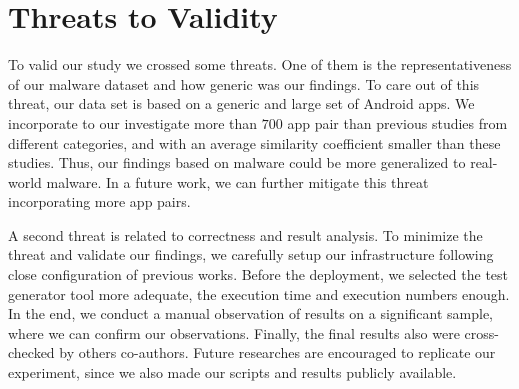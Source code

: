 \section{Threats to Validity}\label{sec:threats}

To valid our study we crossed some threats. One of them is the representativeness of our malware dataset and how generic was our findings. To care out of this threat, our data set is based on a generic and large set of Android apps. We incorporate to our investigate more than $700$ app pair than previous studies from different categories, and with an average similarity coefficient smaller than these studies. Thus, our findings based on malware could be more generalized to real-world malware. In a future work, we can further mitigate this threat incorporating more app pairs. 

A second threat is related to correctness and result analysis. To minimize the threat and validate our findings, we carefully setup our infrastructure following close configuration of previous works. Before the deployment, we selected the test generator tool more adequate, the execution time and execution numbers enough. In the end, we conduct a manual observation of results on a significant sample, where we can confirm our observations. Finally, the final results also were cross-checked by others co-authors. Future researches are encouraged to replicate our experiment, since we also made our scripts and results publicly available.